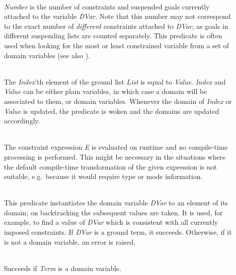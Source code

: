 \begin{description}
\item[] \ \\
{\it Number} is the number of constraints and suspended goals
currently attached to the variable {\it DVar}.
Note that this number may not correspond to the exact number
of {\it different} constraints attached to {\it DVar}, as goals
in different suspending lists are counted separately.
This predicate is often used when looking for the most or least constrained
variable from a set of domain variables (see also ).

\item[] \ \\
The {\it Index}'th element of the ground list {\it List}
is equal to {\it Value}.
{\it Index} and {\it Value} can be either plain variables,
in which case a domain will be associated to them, or domain variables.
Whenever the domain of {\it Index} or {\it Value} is updated,
the predicate is woken and the domains are updated accordingly.

\item[] \ \\
The constraint expression {\it E} is evaluated on runtime
and no compile-time processing is performed.
This might be necessary in the situations where the
default compile-time transformation of the given expression
is not suitable, e.g.\ because it would require type or mode information.

\item[] \ \\
This predicate instantiates the domain variable {\it DVar} to 
an element of its domain; on backtracking the subsequent values are taken.
It is used, for example, to find a value of {\it DVar} which is consistent
with all currently imposed constraints.
If {\it DVar} is a ground term, it succeeds.
Otherwise, if it is not a domain variable, an error is raised.

\item[] \ \\
Succeeds if {\it Term} is a domain variable.


\end{description}
